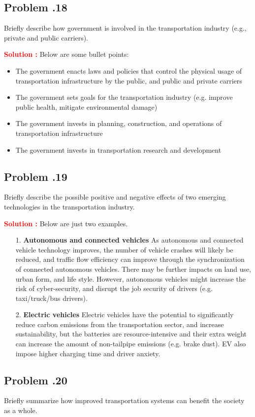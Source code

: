 \documentclass[12pt]{article}
\newcommand{\customsubsection}[1]{
  \subsection*{Problem \thesection.#1}
}
\begin{document}
\customsubsection{18}
Briefly describe how government is involved in the transportation industry (e.g., private and public carriers). 


\textbf{\textcolor{red}{Solution :}} 
Below are some bullet points:
\begin{itemize}
    \item The government enacts laws and policies that control the physical usage of transportation infrastructure by the public, and public and private carriers
\item The government sets goals for the transportation industry (e.g. improve public health, mitigate environmental damage)
\item The government invests in planning, construction, and operations of transportation infrastructure
\item The government invests in transportation research and development

\end{itemize}
\newpage


\customsubsection{19}
Briefly describe the possible positive and negative effects of two emerging technologies in the transportation industry.

\textbf{\textcolor{red}{Solution :}} 
Below are just two examples.
\begin{itemize}
    \item [1.] \textbf{Autonomous and connected vehicles} As autonomous and connected vehicle technology improves, the number of vehicle crashes will likely be reduced, and traffic flow efficiency can improve through the synchronization of connected autonomous vehicles. There may be further impacts on land use, urban form, and life style. However, autonomous vehicles might increase the risk of cyber-security, and disrupt the job security of drivers (e.g. taxi/truck/bus drivers).
    \item[2.] \textbf{Electric vehicles} Electric vehicles have the potential to significantly reduce carbon emissions from the transportation sector, and increase sustainability, but the batteries are resource-intensive and their extra weight can increase the amount of non-tailpipe emissions (e.g. brake dust). EV also impose higher charging time and driver anxiety.
\end{itemize}

\newpage


\customsubsection{20}
Briefly summarize how improved transportation systems can benefit the society as a whole. 
\end{document}

